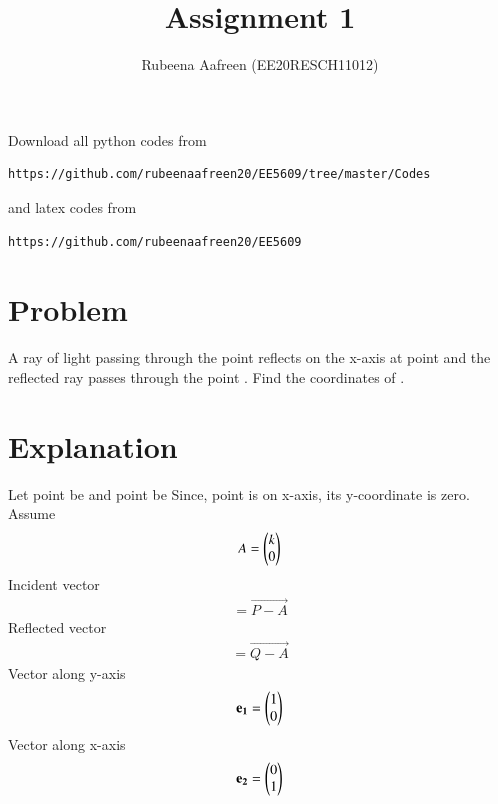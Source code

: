 \documentclass[journal,12pt,twocolumn]{IEEEtran}
\begin{document}
     \def\rightbox#1{\makebox[0in][r]{#1}}
     \def\centbox#1{\makebox[0in]{#1}}
     \def\topbox#1{\raisebox{-\baselineskip}[0in][0in]{#1}}
     \def\midbox#1{\raisebox{-0.5\baselineskip}[0in][0in]{#1}}
\vspace{3cm}
\title{Assignment 1}
\author{Rubeena Aafreen (EE20RESCH11012)}
\maketitle
\newpage
\bigskip
\renewcommand{\thefigure}{\theenumi}
\renewcommand{\thetable}{\theenumi}
Download all python codes from 
\begin{lstlisting}
https://github.com/rubeenaafreen20/EE5609/tree/master/Codes
\end{lstlisting}
%
and latex codes from 
%
\begin{lstlisting}
https://github.com/rubeenaafreen20/EE5609
\end{lstlisting}
%
\section{Problem}
A ray of light passing through the point 
reflects on the x-axis at point  and the reflected ray passes through the point . Find
the coordinates of .
\section{Explanation}
Let point  be  and point  be 
Since, point  is on x-axis, its y-coordinate is zero.
Assume \begin{align}
    A=\begin{pmatrix}k\\0\end{pmatrix}
\end{align}
Incident vector
 \begin{align}
     = \vec{P-A}
\end{align}
Reflected vector 
\begin{align}
    = \vec{Q-A}
\end{align}
Vector along y-axis
\begin{align}
\mathbf{e_1} =\begin{pmatrix}1\\0\end{pmatrix}\\
\end{align}
Vector along x-axis
\begin{align}
 \mathbf{e_2} =\begin{pmatrix}0\\1\end{pmatrix}
\end{align}
\end{document}
